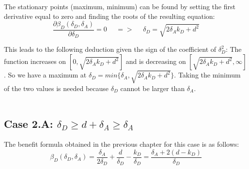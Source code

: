 The stationary points (maximum, minimum) can be found by setting the first derivative equal to zero and finding the roots of the resulting equation:
\begin{equation*}
\frac{\partial \beta_{D}(\delta_{D},\delta_{A})}{\partial \delta_{D}} =0 ~~~~~~ =>~~~~~~ \delta_{D} = \sqrt{2\delta_{A}k_{D} + d^{2}}
\end{equation*}

This leads to the following deduction given the sign of the coefficient of $\delta_{D}^{2}$: The function increases on $[0, \sqrt{2\delta_{A}k_{D} + d^{2}}]$ and is decreasing on $[\sqrt{2\delta_{A}k_{D} + d^{2}}, \infty]$. So we have a maximum at $\delta_{D} = min \{ \delta_{A}, \sqrt{2\delta_{A}k_{D} + d^{2}} \} $. Taking the minimum of the two values is needed because $\delta_{D}$ cannot be larger than $\delta_{A}$. \\
~~\\


\subsection*{Case 2.A: $\delta_{D} \geq d+\delta_{A} \geq \delta_{A} $ }

The benefit formula obtained in the previous chapter for this case is as follows:
\begin{equation*}
\beta_{D}(\delta_{D},\delta_{A})= \dfrac{\delta_{A}}{2\delta_{D}} + \dfrac{d}{\delta_{D}} - \dfrac{k_{D}}{\delta_{D}} = \dfrac{\delta_{A} + 2 (d-k_{D})}{\delta_{D}}
\end{equation*}

